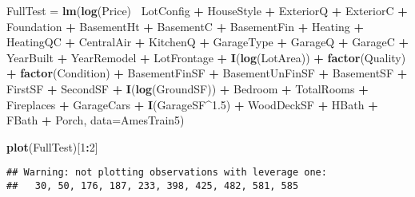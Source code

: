 \documentclass[
]{article}
\newenvironment{Shaded}{\begin{snugshade}}{\end{snugshade}}
\newcommand{\DataTypeTok}[1]{\textcolor[rgb]{0.13,0.29,0.53}{#1}}
\newcommand{\DecValTok}[1]{\textcolor[rgb]{0.00,0.00,0.81}{#1}}
\newcommand{\FloatTok}[1]{\textcolor[rgb]{0.00,0.00,0.81}{#1}}
\newcommand{\KeywordTok}[1]{\textcolor[rgb]{0.13,0.29,0.53}{\textbf{#1}}}
\newcommand{\NormalTok}[1]{#1}
\newcommand{\OperatorTok}[1]{\textcolor[rgb]{0.81,0.36,0.00}{\textbf{#1}}}
\newcommand{\StringTok}[1]{\textcolor[rgb]{0.31,0.60,0.02}{#1}}
\begin{document}
\begin{Shaded}
\begin{Highlighting}[]
\NormalTok{FullTest =}\StringTok{ }\KeywordTok{lm}\NormalTok{(}\KeywordTok{log}\NormalTok{(Price)}\OperatorTok{~}
\StringTok{            }\NormalTok{LotConfig }\OperatorTok{+}\StringTok{ }\NormalTok{HouseStyle }\OperatorTok{+}\StringTok{ }\NormalTok{ExteriorQ }\OperatorTok{+}\StringTok{ }\NormalTok{ExteriorC }\OperatorTok{+}\StringTok{ }\NormalTok{Foundation }\OperatorTok{+}\StringTok{ }\NormalTok{BasementHt }\OperatorTok{+}\StringTok{ }\NormalTok{BasementC }\OperatorTok{+}\StringTok{ }\NormalTok{BasementFin }\OperatorTok{+}\StringTok{ }\NormalTok{Heating }\OperatorTok{+}\StringTok{ }\NormalTok{HeatingQC }\OperatorTok{+}\StringTok{ }\NormalTok{CentralAir }\OperatorTok{+}\StringTok{ }\NormalTok{KitchenQ }\OperatorTok{+}\StringTok{ }\NormalTok{GarageType }\OperatorTok{+}\StringTok{ }\NormalTok{GarageQ }\OperatorTok{+}\StringTok{ }\NormalTok{GarageC }\OperatorTok{+}\StringTok{ }\NormalTok{YearBuilt }\OperatorTok{+}\StringTok{ }\NormalTok{YearRemodel }\OperatorTok{+}\StringTok{ }\NormalTok{LotFrontage }\OperatorTok{+}\StringTok{ }\KeywordTok{I}\NormalTok{(}\KeywordTok{log}\NormalTok{(LotArea)) }\OperatorTok{+}\StringTok{ }\KeywordTok{factor}\NormalTok{(Quality) }\OperatorTok{+}\StringTok{ }\KeywordTok{factor}\NormalTok{(Condition) }\OperatorTok{+}\StringTok{ }\NormalTok{BasementFinSF }\OperatorTok{+}\StringTok{ }\NormalTok{BasementUnFinSF }\OperatorTok{+}\StringTok{ }\NormalTok{BasementSF }\OperatorTok{+}\StringTok{ }\NormalTok{FirstSF }\OperatorTok{+}\StringTok{ }\NormalTok{SecondSF }\OperatorTok{+}\StringTok{ }\KeywordTok{I}\NormalTok{(}\KeywordTok{log}\NormalTok{(GroundSF)) }\OperatorTok{+}\StringTok{ }\NormalTok{Bedroom }\OperatorTok{+}\StringTok{ }\NormalTok{TotalRooms }\OperatorTok{+}\StringTok{ }\NormalTok{Fireplaces }\OperatorTok{+}\StringTok{ }\NormalTok{GarageCars }\OperatorTok{+}\StringTok{ }\KeywordTok{I}\NormalTok{(GarageSF}\OperatorTok{^}\FloatTok{1.5}\NormalTok{) }\OperatorTok{+}\StringTok{ }\NormalTok{WoodDeckSF }\OperatorTok{+}\StringTok{ }\NormalTok{HBath }\OperatorTok{+}\StringTok{ }\NormalTok{FBath }\OperatorTok{+}\StringTok{ }\NormalTok{Porch, }\DataTypeTok{data=}\NormalTok{AmesTrain5)}

\KeywordTok{plot}\NormalTok{(FullTest)[}\DecValTok{1}\OperatorTok{:}\DecValTok{2}\NormalTok{]}
\end{Highlighting}
\end{Shaded}

\begin{verbatim}
## Warning: not plotting observations with leverage one:
##   30, 50, 176, 187, 233, 398, 425, 482, 581, 585
\end{verbatim}
\end{document}
